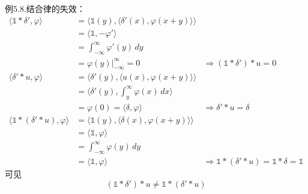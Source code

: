 \documentclass{ctexbook}
\newcommand{\evalat}[3]{\left.#1\right|_{#2}^{#3}}
\begin{document}
\noindent 例5.8.结合律的失效：\begin{align*}
    \langle\mathds{1}*\delta',\varphi\rangle     & =\langle \mathds{1}(y),\langle \delta'(x),\varphi(x+y)\rangle\rangle                                                                   \\
                                                 & =\langle \mathds{1},-\varphi'\rangle                                                                                                   \\
                                                 & =\int_{-\infty}^{\infty}\varphi'(y)\,dy                                                                                                \\
                                                 & =\evalat{\varphi(y)}{-\infty}{\infty}=0                              & \Rightarrow(\mathds{1}*\delta')*u=0                             \\
    \langle \delta'*u,\varphi\rangle             & =\langle \delta'(y),\langle u(x),\varphi(x+y)\rangle\rangle                                                                            \\
                                                 & =\langle \delta'(y),\int_{y}^{\infty}\varphi(x)\,dx\rangle                                                                             \\
                                                 & =\varphi(0)=\langle \delta,\varphi\rangle                            & \Rightarrow \delta'*u=\delta                                    \\
    \langle\mathds{1}*(\delta'*u),\varphi\rangle & =\langle \mathds{1}(y),\langle \delta(x),\varphi(x+y)\rangle\rangle                                                                    \\
                                                 & =\langle \mathds{1},\varphi\rangle                                                                                                     \\
                                                 & =\int_{-\infty}^{\infty}\varphi(y)\,dy                                                                                                 \\
                                                 & =\langle \mathds{1},\varphi\rangle                                   & \Rightarrow \mathds{1}*(\delta'*u)=\mathds{1}*\delta=\mathds{1}
\end{align*}
可见\begin{equation}
    (\mathds{1}*\delta')*u                       \neq\mathds{1}*(\delta'*u)
\end{equation}
\end{document}
